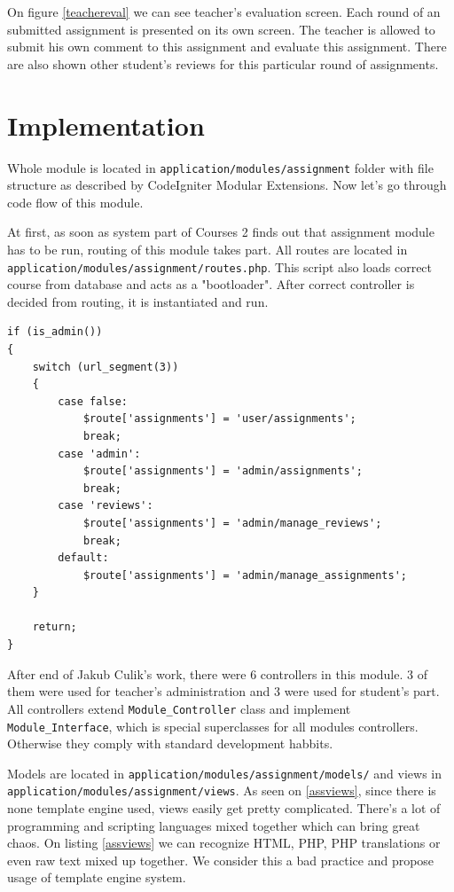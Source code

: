 On figure \ref{teachereval} we can see teacher's evaluation screen. Each round of an submitted assignment is presented on its own screen. The teacher is allowed to submit his own comment to this assignment and evaluate this assignment. There are also shown other student's reviews for this particular round of assignments. 

\section{Implementation}

Whole module is located in \texttt{application/modules/assignment} folder with file structure as described by CodeIgniter Modular Extensions. Now let's go through code flow of this module.


At first, as soon as system part of Courses 2 finds out that assignment module has to be run, routing of this module takes part. All routes are located in \texttt{application/modules/assignment/routes.php}. This script also loads correct course from database and acts as a "bootloader". After correct controller is decided from routing, it is instantiated and run.

\begin{lstlisting}[label={assrouting}, caption={Routing in assignments module for administrator}]
if (is_admin())
{
    switch (url_segment(3))
    {
        case false:
            $route['assignments'] = 'user/assignments';
            break;
        case 'admin':
            $route['assignments'] = 'admin/assignments';
            break;
        case 'reviews':
            $route['assignments'] = 'admin/manage_reviews';
            break;
        default:
            $route['assignments'] = 'admin/manage_assignments';
    }

    return;
}
\end{lstlisting}


After end of Jakub Culik's \cite{culik} work, there were 6 controllers in this module. 3 of them were used for teacher's administration and 3 were used for student's part. All controllers extend \texttt{Module\_Controller} class and implement \texttt{Module\_Interface}, which is special superclasses for all modules controllers. Otherwise they comply with standard development habbits.


Models are located in \texttt{application/modules/assignment/models/} and views in \texttt{application/modules/assignment/views}. As seen on \ref{assviews}, since there is none template engine used, views easily get pretty complicated. There's a lot of programming and scripting languages mixed together which can bring great chaos. On listing \ref{assviews} we can recognize HTML, PHP, PHP translations or even raw text mixed up together. We consider this a bad practice and propose usage of template engine system.


